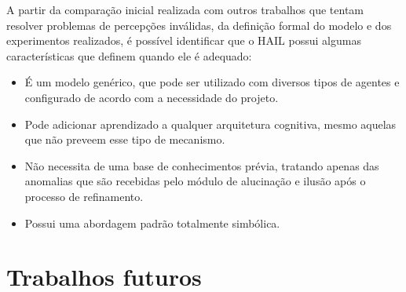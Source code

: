 A partir da comparação inicial realizada com outros trabalhos que tentam resolver problemas de percepções inválidas, da definição formal do modelo e dos experimentos realizados, é possível identificar que o HAIL possui algumas características que definem quando ele é adequado:

\begin{itemize}
    \item É um modelo genérico, que pode ser utilizado com diversos tipos de agentes e configurado de acordo com a necessidade do projeto.
    \item Pode adicionar aprendizado a qualquer arquitetura cognitiva, mesmo aquelas que não preveem esse tipo de mecanismo.
    \item Não necessita de uma base de conhecimentos prévia, tratando apenas das anomalias que são recebidas pelo módulo de alucinação e ilusão após o processo de refinamento.
    \item Possui uma abordagem padrão totalmente simbólica.
\end{itemize}




\section{Trabalhos futuros}

